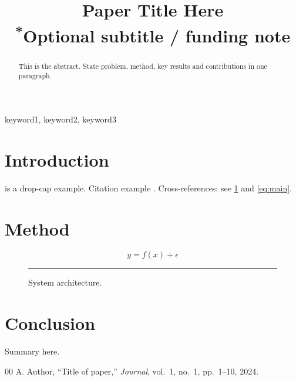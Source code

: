 \documentclass[conference]{IEEEtran}
\begin{document}
\title{Paper Title Here\\
{\footnotesize \textsuperscript{*}Optional subtitle / funding note}}

\author{
\and
{}
}

\maketitle

\begin{abstract}
This is the abstract. State problem, method, key results and contributions in one paragraph.
\end{abstract}

\begin{IEEEkeywords}
keyword1, keyword2, keyword3
\end{IEEEkeywords}

\section{Introduction}
 is a drop-cap example. Citation example \cite{ref1}.
Cross-references: see \cref{fig:arch} and \cref{eq:main}.

\section{Method}
\begin{equation}\label{eq:main}
  y = f(x) + \epsilon
\end{equation}

\begin{figure}[t]
  \centering
  \rule{0.6\linewidth}{3cm}  %
  \caption{System architecture.}
  \label{fig:arch}
\end{figure}


\section{Conclusion}
Summary here.

\begin{thebibliography}{00}
 A. Author, ``Title of paper,'' \textit{Journal}, vol.~1, no.~1, pp.~1--10, 2024.
\end{thebibliography}
% 
% 
\end{document}
